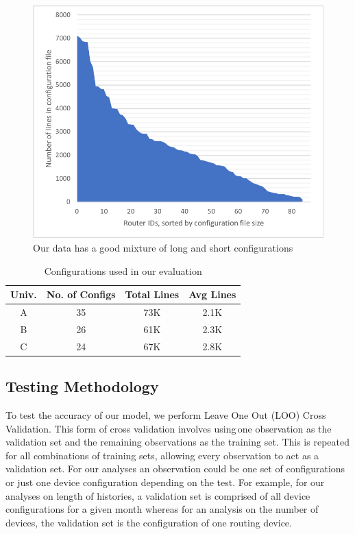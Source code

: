 \begin{figure}[H]
	\centering
	\includegraphics[width=5in]{config_sizes.png}
	\caption{Our data has a good mixture of long and short configurations}
\end{figure}

\begin{table}
    \small \centering
    \begin{tabular}{ | c | c | c | c |}
    \hline
        {\bf Univ.} & {\bf No. of Configs} & {\bf Total Lines} & {\bf Avg
    Lines} \\ 
    \hline
    A & 35 & 73K & 2.1K \\ 
    B & 26 & 61K & 2.3K \\ 
    C & 24 & 67K & 2.8K \\ 
    \hline
    \end{tabular}
    \caption{Configurations used in our evaluation}
    \vspace{-1em}
    \label{tab:datasets}
\end{table}


\subsection{Testing Methodology}

To test the accuracy of our model, we perform Leave One Out (LOO) Cross Validation. This form of cross validation involves using one observation as the validation set and the remaining observations as the training set. This is repeated for all combinations of training sets, allowing every observation to act as a validation set. For our analyses an observation could be one set of configurations or just one device configuration depending on the test. For example, for our analyses on length of histories, a validation set is comprised of all device configurations for a given month whereas for an analysis on the number of devices, the validation set is the configuration of one routing device.\\

